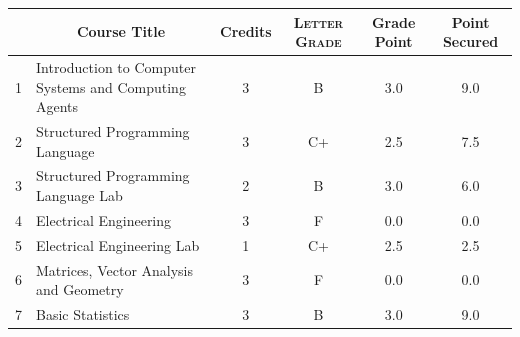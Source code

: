 \documentclass[11pt]{article}
\newcommand*{\numtwo}[1]{\pgfmathprintnumber[
                    fixed, precision=2, fixed zerofill=true]{#1}}
\begin{document}
                \begin{center}
                    \renewcommand{\arraystretch}{1.08}
                    
                \begin{tabular}{|c|l|c|>{\scshape}c|c|c|}
                \hline  \rule[-1ex]{0pt}{3.5ex} {\centering{\bf Course Code}} &  \multicolumn{1}{c|}{\textbf{Course Title}}  & {\bf Credits} & {\bf Letter Grade} & {\bf Grade Point} & {\bf Point Secured}  \\ 
                \hline   1 &  Introduction to Computer Systems and Computing Agents		 & 3 & B & 3.0 & 9.0 \\ %
                \hline   2 &  Structured Programming Language		 & 3 & C+ & 2.5 & 7.5 \\ %
                \hline   3 &  Structured Programming Language Lab		 & 2 & B & 3.0 & 6.0 \\ %
                \hline   4 &  Electrical Engineering		 & 3 & F & 0.0 & 0.0 \\ %
                \hline   5 &  Electrical Engineering Lab		 & 1 & C+ & 2.5 & 2.5 \\ %
                \hline   6 &  Matrices, Vector Analysis and Geometry		 & 3 & F & 0.0 & 0.0 \\ %
                \hline   7 &  Basic Statistics		 & 3 & B & 3.0 & 9.0 \\ %

\hline                %
                \end{tabular}
                \end{center}
                \renewcommand{\arraystretch}{1.03}
\end{document}
